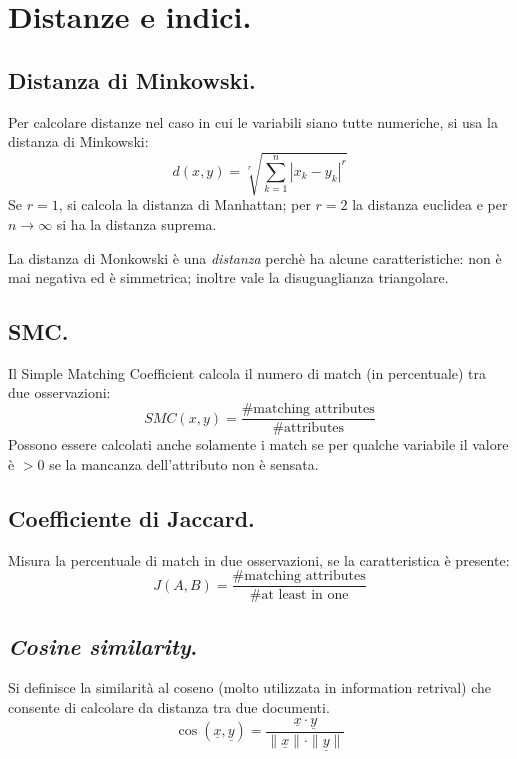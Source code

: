 \documentclass[11pt, a4page, twocolumn]{article}
\begin{document}
\section{Distanze e indici.}
\subsection{Distanza di Minkowski.}
Per calcolare distanze nel caso in cui le variabili siano tutte numeriche, si usa la distanza di Minkowski:
\begin{equation*}
d(x, y) = \sqrt[r]{\sum^{n}_{k=1}{|x_k - y_k|^r}}
\end{equation*}
Se $r = 1$, si calcola la distanza di Manhattan; per $r = 2$ la distanza euclidea e per $n \to \infty$ si ha la distanza suprema.

La distanza di Monkowski è una \textit{distanza} perchè ha alcune caratteristiche: non è mai negativa ed è simmetrica; inoltre vale la disuguaglianza triangolare.

\subsection{SMC.}
Il Simple Matching Coefficient calcola il numero di match (in percentuale) tra due osservazioni:
\begin{equation*}
SMC(x, y) = \frac{\text{\# matching attributes}}{\text{\# attributes}}
\end{equation*}
Possono essere calcolati anche solamente i match se per qualche variabile il valore è $> 0$ se la mancanza dell'attributo non è sensata.

\subsection{Coefficiente di Jaccard.}
Misura la percentuale di match in due osservazioni, se la caratteristica è presente:
\begin{equation*}
J(A, B) = \frac{\text{\# matching attributes}}{\text{\# at least in one}}
\end{equation*}

\subsection{\textit{Cosine similarity}.}
Si definisce la similarità al coseno (molto utilizzata in information retrival) che consente di calcolare da distanza tra due documenti.
\begin{equation*}
  \cos(\underline{x}, \underline{y}) = \frac{\underline{x} \cdot \underline{y}}{\|\underline{x}\| \cdot \|\underline{y}\|}
\end{equation*}
\end{document}
